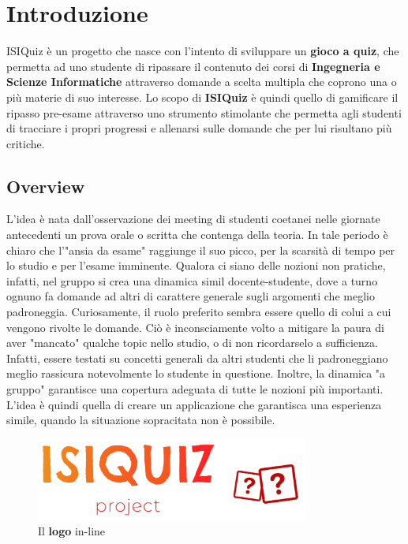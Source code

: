 

\chapter{Introduzione}
ISIQuiz è un progetto che nasce con l'intento di sviluppare un \textbf{gioco a quiz}, che permetta ad uno studente di ripassare il contenuto dei corsi di \textbf{Ingegneria e Scienze Informatiche} attraverso domande a scelta multipla che coprono una o più materie di suo interesse. Lo scopo di \textbf{ISIQuiz} è quindi quello di gamificare il ripasso pre-esame attraverso uno strumento stimolante che permetta agli studenti di tracciare i propri progressi e allenarsi sulle domande che per lui risultano più critiche.

\section{Overview}
L'idea è nata dall'osservazione dei meeting di studenti coetanei nelle giornate antecedenti un prova orale o scritta che contenga della teoria. In tale periodo è chiaro che l'"ansia da esame" raggiunge il suo picco, per la scarsità di tempo per lo studio e per l'esame imminente. Qualora ci siano delle nozioni non pratiche, infatti, nel gruppo si crea una dinamica simil docente-studente, dove a turno ognuno fa domande ad altri di carattere generale sugli argomenti che meglio padroneggia. Curiosamente, il ruolo preferito sembra essere quello di colui a cui vengono rivolte le domande. Ciò è inconsciamente volto a mitigare la paura di aver "mancato" qualche topic nello studio, o di non ricordarselo a sufficienza. Infatti, essere testati su concetti generali da altri studenti che li padroneggiano meglio rassicura notevolmente lo studente in questione. Inoltre, la dinamica "a gruppo" garantisce una copertura adeguata di tutte le nozioni più importanti. L'idea è quindi quella di creare un applicazione che garantisca una esperienza simile, quando la situazione sopracitata non è possibile. 
\begin{figure}[H]
    \caption{Il \textbf{logo} in-line}
    \label{fig:Logo}
    \centering
    \includegraphics[width=0.8\textwidth]{Extra/ISIQuizLogoLineTransparent.png}
\end{figure}

